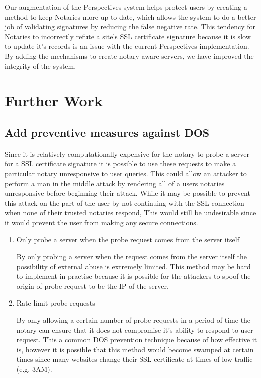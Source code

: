 \documentclass[preprint,review,12pt]{elsarticle}
\begin{document}
Our augmentation of the Perspectives system helps protect users by creating a
method to keep Notaries more up to date, which allows the system to do a better
job of validating signatures by reducing the false negative rate. This tendency
for Notaries to incorrectly refute a site's SSL certificate signature because
it is slow to update it's records is an issue with the current Perspectives
implementation. By adding the mechanisms to create notary aware servers, we
have improved the integrity of the system.

\section{Further Work}
\label{further work}

\subsection{Add preventive measures against DOS}

Since it is relatively computationally expensive for the notary to probe a
server for a SSL certificate signature it is possible to use these requests to
make a particular notary unresponsive to user queries. This could allow an
attacker to perform a man in the middle attack by rendering all of a users
notaries unresponsive before beginning their attack. While it may be possible
to prevent this attack on the part of the user by not continuing with the SSL
connection when none of their trusted notaries respond, This would still be
undesirable since it would prevent the user from making any secure connections.

\begin{enumerate}
    \item {Only probe a server when the probe request comes from the server itself}

        By only probing a server when the request comes from the server itself
        the possibility of external abuse is extremely limited. This method may
        be hard to implement in practise because it is possible for the
        attackers to spoof the origin of probe request to be the IP of the
        server.

    \item {Rate limit probe requests}

        By only allowing a certain number of probe requests in a period of time
        the notary can ensure that it does not compromise it's ability to
        respond to user request. This a common DOS prevention technique because
        of how effective it is, however it is possible that this method would
        become swamped at certain times since many websites change their SSL
        certificate at times of low traffic (e.g. 3AM).
\end{enumerate}
\end{document}
